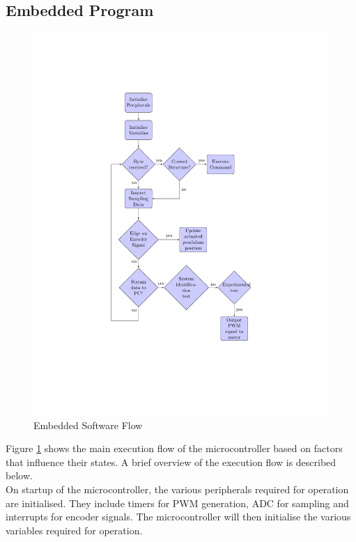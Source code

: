 \subsection{Embedded Program}
\begin{figure}[h]

\includegraphics[scale=0.8]{./figs/software_flow/software_flow.pdf}
\caption{Embedded Software Flow}
\label{fig:software_flow}
\end{figure}


Figure \ref{fig:software_flow} shows the main execution flow of the microcontroller based on factors that influence their states. A brief overview of the execution flow is described below.\\

On startup of the microcontroller, the various peripherals required for operation are initialised. They include timers for PWM generation, ADC for sampling and interrupts for encoder signals. The microcontroller will then initialise the various variables required for operation.\\

